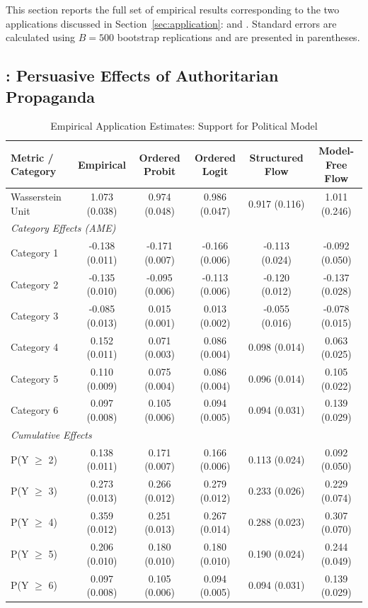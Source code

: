 \documentclass{article}
\numberwithin{figure}{section}
\numberwithin{table}{section}
\numberwithin{equation}{section}
\begin{document}
This section reports the full set of empirical results corresponding to the two applications discussed in Section~\ref{sec:application}: \citet{Tomz2020a} and \citet{Mattingly2025a}. Standard errors are calculated using $B=500$ bootstrap replications and are presented in parentheses.

\subsection{\citet{Mattingly2025a}: Persuasive Effects of Authoritarian Propaganda}

\begin{table}[htbp]
\centering
\caption{Empirical Application Estimates: Support for Political Model \citep{Mattingly2025a}}
\label{tab:table_mattingly_empirical}
\small
\begin{tabular}{lccccc}
\toprule
\textbf{Metric / Category} & \textbf{Empirical} & \textbf{Ordered Probit} & \textbf{Ordered Logit} & \textbf{Structured Flow} & \textbf{Model-Free Flow} \\
\midrule
Wasserstein Unit & 1.073 (0.038) & 0.974 (0.048) & 0.986 (0.047) & 0.917 (0.116) & 1.011 (0.246) \\
\midrule
\multicolumn{6}{l}{\textit{Category Effects (AME)}} \\
  Category 1 & -0.138 (0.011) & -0.171 (0.007) & -0.166 (0.006) & -0.113 (0.024) & -0.092 (0.050) \\
  Category 2 & -0.135 (0.010) & -0.095 (0.006) & -0.113 (0.006) & -0.120 (0.012) & -0.137 (0.028) \\
  Category 3 & -0.085 (0.013) & 0.015 (0.001)  & 0.013 (0.002)  & -0.055 (0.016) & -0.078 (0.015) \\
  Category 4 & 0.152 (0.011)  & 0.071 (0.003)  & 0.086 (0.004)  & 0.098 (0.014)  & 0.063 (0.025) \\
  Category 5 & 0.110 (0.009)  & 0.075 (0.004)  & 0.086 (0.004)  & 0.096 (0.014)  & 0.105 (0.022) \\
  Category 6 & 0.097 (0.008)  & 0.105 (0.006)  & 0.094 (0.005)  & 0.094 (0.031)  & 0.139 (0.029) \\
\midrule
\multicolumn{6}{l}{\textit{Cumulative Effects}} \\
  P(Y $\ge$ 2) & 0.138 (0.011) & 0.171 (0.007) & 0.166 (0.006) & 0.113 (0.024) & 0.092 (0.050) \\
  P(Y $\ge$ 3) & 0.273 (0.013) & 0.266 (0.012) & 0.279 (0.012) & 0.233 (0.026) & 0.229 (0.074) \\
  P(Y $\ge$ 4) & 0.359 (0.012) & 0.251 (0.013) & 0.267 (0.014) & 0.288 (0.023) & 0.307 (0.070) \\
  P(Y $\ge$ 5) & 0.206 (0.010) & 0.180 (0.010) & 0.180 (0.010) & 0.190 (0.024) & 0.244 (0.049) \\
  P(Y $\ge$ 6) & 0.097 (0.008) & 0.105 (0.006) & 0.094 (0.005) & 0.094 (0.031) & 0.139 (0.029) \\
\bottomrule
\end{tabular}
\end{table}
\end{document}
